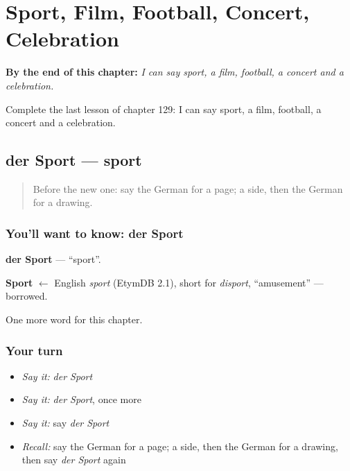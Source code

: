 
\chapter{Sport, Film, Football, Concert, Celebration}
\label{ch:ge-sport-film-football-concert-celebration}

\begin{chapteropening}
\textbf{By the end of this chapter:} \emph{I can say sport, a film, football, a concert and a celebration.}

Complete the last lesson of chapter 129: I can say sport, a film, football, a concert and a celebration.
\end{chapteropening}

\section[der Sport]{der Sport — sport}

\label{lesson:GE-C129-sport}



\begin{quote}
Before the new one: say the German for a page; a side, then the German for a drawing.
\end{quote}

\subsection*{You'll want to know: der Sport}
\textbf{der Sport} — \textquotedblleft{}sport\textquotedblright{}.

\begin{cousinweb}
\textbf{Sport} $\leftarrow$ English \emph{sport} (EtymDB 2.1), short for \emph{disport}, \textquotedblleft{}amusement\textquotedblright{} — borrowed.
\end{cousinweb}

\begin{grammarlens}[title={What you've built}]
One more word for this chapter.
\end{grammarlens}

\subsection*{Your turn}
\begin{itemize}
\raggedright
  \item \emph{Say it:} \emph{der Sport}
  \item \emph{Say it:} \emph{der Sport}, once more
  \item \emph{Say it:} say \emph{der Sport}
  \item \emph{Recall:} say the German for a page; a side, then the German for a drawing, then say \emph{der Sport} again
\end{itemize}

